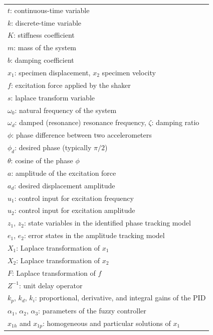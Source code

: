 \documentclass[lettersize,journal]{IEEEtran}
\begin{document}
\begin{table}[h]
    \centering
    \begin{tabular}{|l|}
        \hline
        $t$: continuous-time variable \\
	 $k$: discrete-time variable \\ 
        $K$:  stiffness coefficient \\
	 $m$:  mass of the system \\
        $b$:  damping coefficient \\
        $x_1$:  specimen displacement,  $x_2$  specimen velocity \\
        $f$:  excitation force applied by the shaker \\
        $s$:  laplace transform variable \\
        $\omega_0$:  natural frequency of the system \\
        $\omega_d$:  damped (resonance) resonance frequency,
        $\zeta$:  damping ratio \\
        $\phi$:  phase difference between two accelerometers  \\
        $\phi_d$:  desired phase (typically $\pi/2$) \\
        $\theta$:  cosine of the phase $\phi$ \\
        $a$:  amplitude of the excitation force \\
        $a_d$:  desired displacement amplitude \\
        $u_1$: control input for excitation frequency \\
        $u_2$:  control input for excitation amplitude \\
        $z_1$, $z_2$:  state variables in the identified phase tracking model \\
        $e_1$, $e_2$:  error states in the amplitude tracking model \\
$X_1$: Laplace transformation of $x_1$ \\
$X_2$: Laplace transformation of $x_2$ \\
$F$: Laplace transformation of $f$ \\
$Z^{-1}$: unit delay operator \\
$k_p$, $k_d$, $k_i$: proportional, derivative, and integral gains of the PID\\
$\alpha_1$, $\alpha_2$, $\alpha_3$: parameters of the fuzzy controller \\
$x_{1h}$ and $x_{1p}$: homogeneous and particular solutions of $x_1$ \\

\end{tabular}
\end{table}
\end{document}
